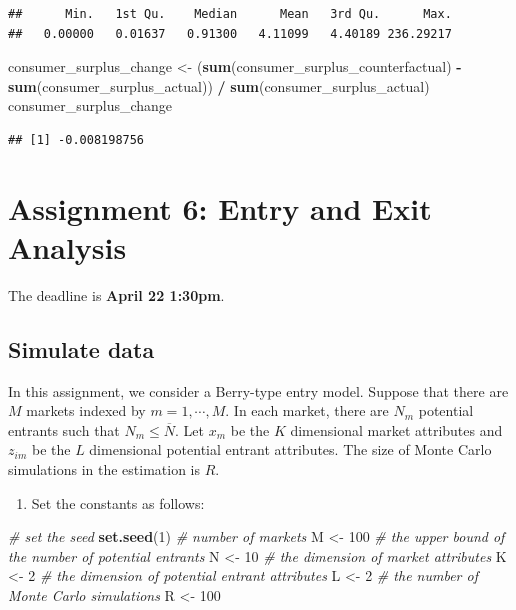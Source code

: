 \documentclass[]{book}
\newenvironment{Shaded}{\begin{snugshade}}{\end{snugshade}}
\newcommand{\KeywordTok}[1]{\textcolor[rgb]{0.13,0.29,0.53}{\textbf{#1}}}
\newcommand{\DecValTok}[1]{\textcolor[rgb]{0.00,0.00,0.81}{#1}}
\newcommand{\StringTok}[1]{\textcolor[rgb]{0.31,0.60,0.02}{#1}}
\newcommand{\CommentTok}[1]{\textcolor[rgb]{0.56,0.35,0.01}{\textit{#1}}}
\newcommand{\OperatorTok}[1]{\textcolor[rgb]{0.81,0.36,0.00}{\textbf{#1}}}
\newcommand{\NormalTok}[1]{#1}
\providecommand{\tightlist}{%
  \setlength{\itemsep}{0pt}\setlength{\parskip}{0pt}}
\begin{document}
\begin{verbatim}
##      Min.   1st Qu.    Median      Mean   3rd Qu.      Max. 
##   0.00000   0.01637   0.91300   4.11099   4.40189 236.29217
\end{verbatim}

\begin{Shaded}
\begin{Highlighting}[]
\NormalTok{consumer_surplus_change <-}\StringTok{ }
\StringTok{  }\NormalTok{(}\KeywordTok{sum}\NormalTok{(consumer_surplus_counterfactual) }\OperatorTok{-}\StringTok{ }
\StringTok{     }\KeywordTok{sum}\NormalTok{(consumer_surplus_actual)) }\OperatorTok{/}
\StringTok{  }\KeywordTok{sum}\NormalTok{(consumer_surplus_actual)}
\NormalTok{consumer_surplus_change}
\end{Highlighting}
\end{Shaded}

\begin{verbatim}
## [1] -0.008198756
\end{verbatim}

\chapter{Assignment 6: Entry and Exit Analysis}\label{assignment6}

The deadline is \textbf{April 22 1:30pm}.

\section{Simulate data}\label{simulate-data-5}

In this assignment, we consider a Berry-type entry model. Suppose that
there are \(M\) markets indexed by \(m = 1, \cdots, M\). In each market,
there are \(N_m\) potential entrants such that \(N_m \le \overline{N}\).
Let \(x_m\) be the \(K\) dimensional market attributes and \(z_{im}\) be
the \(L\) dimensional potential entrant attributes. The size of Monte
Carlo simulations in the estimation is \(R\).

\begin{enumerate}
\def\labelenumi{\arabic{enumi}.}
\tightlist
\item
  Set the constants as follows:
\end{enumerate}

\begin{Shaded}
\begin{Highlighting}[]
\CommentTok{# set the seed}
\KeywordTok{set.seed}\NormalTok{(}\DecValTok{1}\NormalTok{)}
\CommentTok{# number of markets}
\NormalTok{M <-}\StringTok{ }\DecValTok{100}
\CommentTok{# the upper bound of the number of potential entrants}
\NormalTok{N <-}\StringTok{ }\DecValTok{10}
\CommentTok{# the dimension of market attributes}
\NormalTok{K <-}\StringTok{ }\DecValTok{2}
\CommentTok{# the dimension of potential entrant attributes}
\NormalTok{L <-}\StringTok{ }\DecValTok{2}
\CommentTok{# the number of Monte Carlo simulations}
\NormalTok{R <-}\StringTok{ }\DecValTok{100}
\end{Highlighting}
\end{Shaded}
\end{document}
